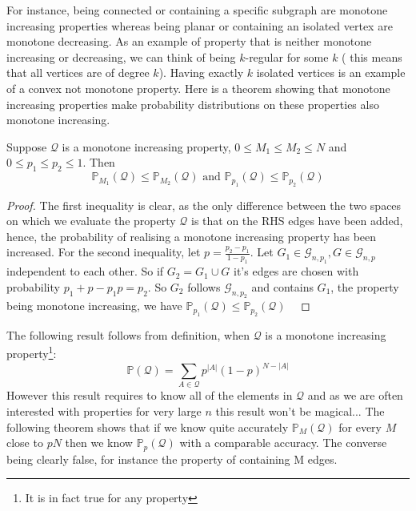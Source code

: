 For instance, being connected or containing a specific subgraph are monotone increasing properties whereas being planar or containing an isolated vertex are monotone decreasing. 
As an example of property that is neither monotone increasing or decreasing, we can think of being $k$-regular for some $k$ ( this means that all vertices are of degree $k$).
Having exactly $k$ isolated vertices is an example of a convex not monotone property.
\newline
Here is a theorem showing that monotone increasing properties make probability distributions on these properties also monotone increasing.
\begin{theorem}\label{th:QIncr}
	Suppose $\mathcal{Q}$ is a monotone increasing property, $0 \leq M_1 \leq M_2 \leq N$ and $0 \leq p_1 \leq p_2 \leq 1$.
	\newline
	Then
	\begin{equation}
		\mathbb{P}_{M_1}(\mathcal{Q}) \leq  \mathbb{P}_{M_2}(\mathcal{Q}) \text{  and  } \mathbb{P}_{p_1}(\mathcal{Q}) \leq \mathbb{P}_{p_2}(\mathcal{Q})
	\end{equation}
\end{theorem}
\begin{proof}
	The first inequality is clear, as the only difference between the two spaces on which we evaluate the property $\mathcal{Q}$ is that on the RHS edges have been added, hence, the probability of realising a monotone increasing property has been increased.	
	\newline
	For the second inequality, let $p = \frac{p_2 - p_1}{1 - p_1}$. Let $G_1 \in \mathcal{G}_{n, p_1}, G \in \mathcal{G}_{n, p}$ independent to each other.
	\newline
	So if $G_2 = G_1 \cup G$ it's edges are chosen with probability $p_1 + p - p_1 p = p_2$. 
	So $G_2$ follows $\mathcal{G}_{n,p_2}$ and contains $G_1$, the property being monotone increasing, we have $ \mathbb{P}_{p_1}(\mathcal{Q}) \leq \mathbb{P}_{p_2}(\mathcal{Q})$
\
\end{proof}
The following result follows from definition, when $\mathcal{Q}$ is a monotone increasing property\footnote{It is in fact true for any property}:
\begin{equation}\label{eq:QProp}
	\mathbb{P}(\mathcal{Q}) = \sum_{A \in \mathcal{Q}} p^{|A|}(1-p)^{N-|A|}
\end{equation}
However this result requires to know all of the elements in $\mathcal{Q}$ and as we are often interested with properties for very large $n$ this result won't be magical... 
\newline
The following theorem shows that if we know quite accurately $\mathbb{P}_M(\mathcal{Q})$ for every $M$ close to $pN$ then we know $\mathbb{P}_p(\mathcal{Q})$ with a comparable accuracy. The converse being clearly false, for instance the property of containing M edges.

